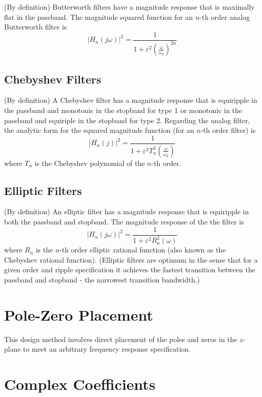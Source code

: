 \documentclass[11pt]{book}
\theoremstyle{example}
\begin{document}
(By definition) Butterworth filters have a magnitude response that is maximally flat in the passband. The magnitude squared function for an $n$-th order analog Butterworth filter is
\begin{equation}
	|H_n(j\omega)|^2=\frac{1}{1+\varepsilon^2\left(\frac{\omega}{\omega_p}\right)^{2n}}
\end{equation}

\subsection{Chebyshev Filters}
(By definition) A Chebyshev filter has a magnitude response that is equiripple in the passband and monotonic in the stopband for type 1 or monotonic in the passband and equiriple in the stopband for type 2. Regarding the analog filter, the analytic form for the squared magnitude function (for an  $n$-th order filter) is
\begin{equation}
	|H_n(j)|^2=\frac{1}{1+\varepsilon^2T_n^2\left(\frac{\omega}{\omega_p}\right)}
\end{equation}
where $T_n$ is the Chebyshev polynomial of the $n$-th order.

\subsection{Elliptic Filters}
(By definition) An elliptic filter has a magnitude response that is equiripple in both the passband and stopband. The magnitude response of the the filter is
\begin{equation}
	|H_n(j\omega)|^2=\frac{1}{1+\varepsilon^2R_n^2(\omega)}
\end{equation}
where $R_n$ is the $n$-th order elliptic rational function (also known as the Chebyshev rational function). (Elliptic filters are optimum in the sense that for a given order and ripple specification it achieves the fastest transition between the passband and stopband - the narrowest transition bandwidth.) 

\section{Pole-Zero Placement}

This design method involves direct placement of the poles and zeros in the $z$-plane to meet an arbitrary frequency response specification.

\section{Complex Coefficients}
\end{document}
